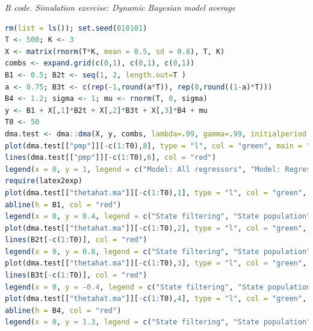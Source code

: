 \begin{tcolorbox}[enhanced,width=4.67in,center upper,
	fontupper=\large\bfseries,drop shadow southwest,sharp corners]
	\textit{R code. Simulation exercise: Dynamic Bayesian model average}
	\begin{VF}
		\begin{lstlisting}[language=R]
rm(list = ls()); set.seed(010101)
T <- 500; K <- 3
X <- matrix(rnorm(T*K, mean = 0.5, sd = 0.8), T, K)
combs <- expand.grid(c(0,1), c(0,1), c(0,1))
B1 <- 0.5; B2t <- seq(1, 2, length.out=T )
a <- 0.75; B3t <- c(rep(-1,round(a*T)), rep(0,round((1-a)*T)))
B4 <- 1.2; sigma <- 1; mu <- rnorm(T, 0, sigma)
y <- B1 + X[,1]*B2t + X[,2]*B3t + X[,3]*B4 + mu
T0 <- 50
dma.test <- dma::dma(X, y, combs, lambda=.99, gamma=.99, initialperiod = T0)
plot(dma.test[["pmp"]][-c(1:T0),8], type = "l", col = "green", main = "Posterior model probability: Model all regressors vs model regressors 1 and 3", xlab = "Time", ylab = "PMP")
lines(dma.test[["pmp"]][-c(1:T0),6], col = "red")
legend(x = 0, y = 1, legend = c("Model: All regressors", "Model: Regressors 1 and 3"), col = c("green", "red"), lty=1:1, cex=0.8)
require(latex2exp)
plot(dma.test[["thetahat.ma"]][-c(1:T0),1], type = "l", col = "green", main = "Bayesian model average filtering recursion", xlab = "Time", ylab = TeX("$\\beta_{1}$"))
abline(h = B1, col = "red")
legend(x = 0, y = 0.4, legend = c("State filtering", "State population"), col = c("green", "red"), lty=1:1, cex=0.8)
plot(dma.test[["thetahat.ma"]][-c(1:T0),2], type = "l", col = "green", main = "Bayesian model average filtering recursion", xlab = "Time", ylab = TeX("$\\beta_{2t}$"), ylim = c(0.5,2))
lines(B2t[-c(1:T0)], col = "red")
legend(x = 0, y = 0.8, legend = c("State filtering", "State population"), col = c("green", "red"), lty=1:1, cex=0.8)
plot(dma.test[["thetahat.ma"]][-c(1:T0),3], type = "l", col = "green", main = "Bayesian model average filtering recursion", xlab = "Time", ylab = TeX("$\\beta_{3t}$"))
lines(B3t[-c(1:T0)], col = "red")
legend(x = 0, y = -0.4, legend = c("State filtering", "State population"), col = c("green", "red"), lty=1:1, cex=0.8)
plot(dma.test[["thetahat.ma"]][-c(1:T0),4], type = "l", col = "green", main = "Bayesian model average filtering recursion", xlab = "Time", ylab = TeX("$\\beta_{4t}$"))
abline(h = B4, col = "red")
legend(x = 0, y = 1.3, legend = c("State filtering", "State population"), col = c("green", "red"), lty=1:1, cex=0.8)
\end{lstlisting}
	\end{VF}
\end{tcolorbox}

